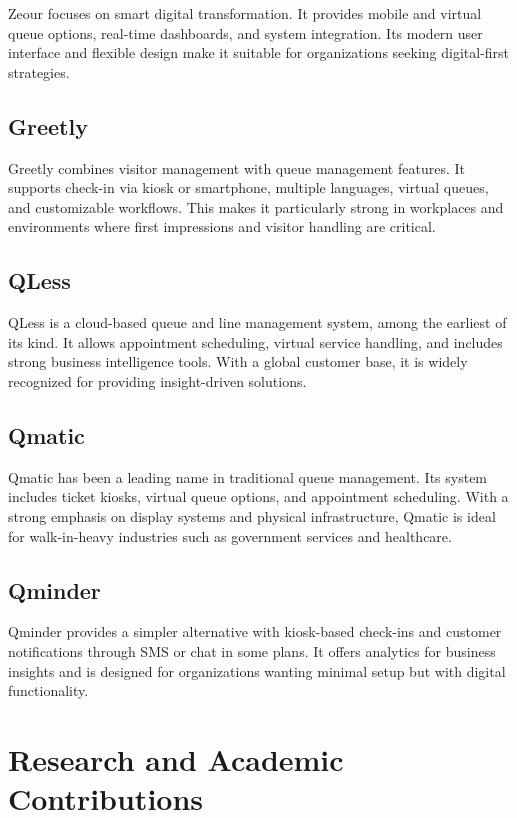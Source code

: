 \documentclass[12pt,a4paper]{report}
\begin{document}
Zeour focuses on smart digital transformation. It provides mobile and virtual queue options, real-time dashboards, and system integration. Its modern user interface and flexible design make it suitable for organizations seeking digital-first strategies.

\subsection{Greetly}

Greetly combines visitor management with queue management features. It supports check-in via kiosk or smartphone, multiple languages, virtual queues, and customizable workflows. This makes it particularly strong in workplaces and environments where first impressions and visitor handling are critical.

\subsection{QLess}

QLess is a cloud-based queue and line management system, among the earliest of its kind. It allows appointment scheduling, virtual service handling, and includes strong business intelligence tools. With a global customer base, it is widely recognized for providing insight-driven solutions.

\subsection{Qmatic}

Qmatic has been a leading name in traditional queue management. Its system includes ticket kiosks, virtual queue options, and appointment scheduling. With a strong emphasis on display systems and physical infrastructure, Qmatic is ideal for walk-in-heavy industries such as government services and healthcare.

\subsection{Qminder}

Qminder provides a simpler alternative with kiosk-based check-ins and customer notifications through SMS or chat in some plans. It offers analytics for business insights and is designed for organizations wanting minimal setup but with digital functionality.

\section{Research and Academic Contributions}
\end{document}
